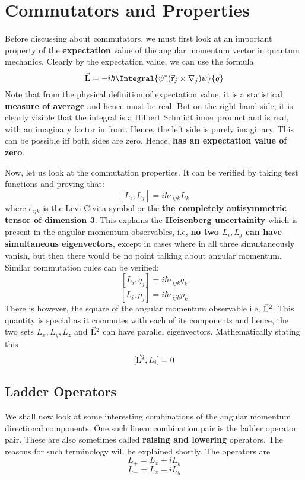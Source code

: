 \documentclass[12pt]{article}
\begin{document}
\section{Commutators and Properties}
Before discussing about commutators, we must first look at an important property of the \textbf{expectation} value of the angular momentum vector in quantum mechanics. Clearly by the expectation value, we can use the formula 
$$\vect{\textbf{L}} = -i\hbar\Integral{\psi^*(\vectcrossvect{\vect{r}_j}{\gradient_j})\psi}{q}$$ Note that from the physical definition of expectation value, it is a statistical \textbf{measure of average} and hence must be real. But on the right hand side, it is clearly visible that the integral is a Hilbert Schmidt inner product and is real, with an imaginary factor in front. Hence, the left side is purely imaginary. This can be possible iff both sides are zero. Hence, \textbf{ has an expectation value of zero}. 

Now, let us look at the commutation properties. It can be verified by taking test functions and proving that:
$$[L_i, L_j] = i\hbar\epsilon_{ijk}L_k$$ where $\epsilon_{ijk}$ is the Levi Civita symbol or the \textbf{the completely antisymmetric tensor of dimension 3}. This explains the \textbf{Heisenberg uncertainity} which is present in the angular momentum observables, i.e, \textbf{no two $L_i, L_j$ can have simultaneous eigenvectors}, except in cases where in all three simultaneously vanish, but then there would be no point talking about angular momentum. Similar commutation rules can be verified:
$$[L_i,q_j] = i\hbar\epsilon_{ijk}q_k$$
$$[L_i,p_j] = i\hbar\epsilon_{ijk}p_k$$
There is however, the square of the angular momentum observable i.e, \textbf{$\vec{\mathrm{L}}^2$}. This quantity is special as it commutes with each of its components and hence, the two sets ${L_x,L_y,L_z}$ and \textbf{$\vec{\mathrm{L}}^2$} can have parallel eigenvectors. Mathematically stating this $$[\vec{\mathrm{L}}^2, L_i] = 0$$

\subsection{Ladder Operators}
We shall now look at some interesting combinations of the angular momentum directional components. One such linear combination pair is the ladder operator pair. These are also sometimes called \textbf{raising and lowering} operators. The reasons for such terminology will be explained shortly. The operators are
$$L_+ = L_x + iL_y$$
$$L_-  = L_x - iL_y$$
\end{document}

